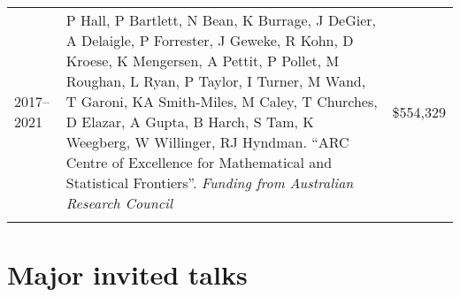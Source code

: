 \documentclass[10pt,a4paper,]{article}
\begin{document}
\begin{tabular}{lp{13.3cm}r}
   \\[-0.2cm]2017--2021 & P Hall, P Bartlett, N Bean, K Burrage, J DeGier, A Delaigle, P Forrester, J Geweke, R Kohn, D Kroese, K Mengersen, A Pettit, P Pollet, M Roughan, L Ryan, P Taylor, I Turner, M Wand, T Garoni, KA Smith-Miles, M Caley, T Churches, D Elazar, A Gupta, B Harch, S Tam, K Weegberg, W Willinger, RJ Hyndman. ``ARC Centre of Excellence for Mathematical and Statistical Frontiers''. \emph{Funding from Australian Research Council} & \$554,329 \\ 
   \\[-0.2cm] \hline
\end{tabular}
\endgroup

\hypertarget{major-invited-talks}{%
\section{Major invited talks}\label{major-invited-talks}}
\end{document}

